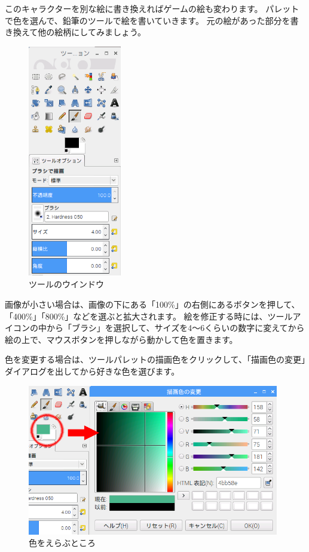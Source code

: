 このキャラクターを別な絵に書き換えればゲームの絵も変わります。
パレットで色を選んで、鉛筆のツールで絵を書いていきます。
元の絵があった部分を書き換えて他の絵柄にしてみましょう。

\begin{figure}[H]
    \begin{center}
        \includegraphics[keepaspectratio,width=4.075cm,height=10.16cm]{text02-img/text02-img039.png}
        \caption{ツールのウインドウ}
    \end{center}
\end{figure}

画像が小さい場合は、画像の下にある「100\%」の右側にあるボタンを押して、「400\%」「800\%」などを選ぶと拡大されます。
絵を修正する時には、ツールアイコンの中から「ブラシ」を選択して、サイズを4〜6くらいの数字に変えてから絵の上で、マウスボタンを押しながら動かして色を置きます。

色を変更する場合は、ツールパレットの描画色をクリックして、「描画色の変更」ダイアログを出してから好きな色を選びます。

\begin{figure}[H]
    \begin{center}
        \includegraphics[keepaspectratio,width=10.993cm,height=6.588cm]{text02-img/text02-img040.png}
        \caption{色をえらぶところ}
    \end{center}
\end{figure}

